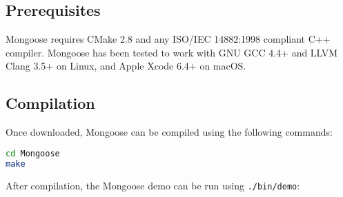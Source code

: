 \documentclass[letter]{article}
\begin{document}
\subsection{Prerequisites}
Mongoose requires CMake 2.8 and any ISO/IEC 14882:1998 compliant C++ compiler. Mongoose has been tested to work with GNU GCC 4.4+ and LLVM Clang 3.5+ on Linux, and Apple Xcode 6.4+ on macOS.

\subsection{Compilation}
Once downloaded, Mongoose can be compiled using the following commands:\\

\begin{lstlisting}[language=bash,numbers=none,xleftmargin=.2\textwidth, xrightmargin=.2\textwidth]
cd Mongoose
make
\end{lstlisting}


After compilation, the Mongoose demo can be run using \texttt{./bin/demo}:\\
\end{document}
